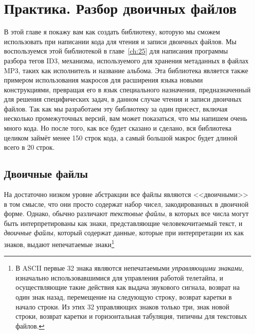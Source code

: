 \chapter{Практика. Разбор двоичных файлов}
\label{ch:24}

В этой главе я покажу вам как создать библиотеку, которую мы сможем использовать при
написании кода для чтения и записи двоичных файлов. Мы воспользуемся этой библиотекой в
главе~\ref{ch:25} для написания программы разбора тегов ID3, механизма, используемого для
хранения метаданных в файлах MP3, таких как исполнитель и название альбома. Эта библиотека
является также примером использования макросов для расширения языка новыми конструкциями,
превращая его в язык специального назначения, предназначенный для решения специфических
задач, в данном случае чтения и записи двоичных файлов. Так как мы разработаем эту
библиотеку за один присест, включая несколько промежуточных версий, вам может показаться,
что мы напишем очень много кода. Но после того, как все будет сказано и сделано, вся
библиотека целиком займёт менее 150 строк кода, а самый большой макрос будет длиной всего
в 20 строк.

\section{Двоичные файлы}

На достаточно низком уровне абстракции все файлы являются <<двоичными>> в том смысле, что
они просто содержат набор чисел, закодированных в двоичной форме.  Однако, обычно
различают \textit{текстовые файлы}, в которых все числа могут быть интерпретированы как
знаки, представляющие человекочитаемый текст, и \textit{двоичные файлы}, который содержат
данные, которые при интерпретации их как знаков, выдают непечатаемые знаки\footnote{В
  ASCII первые 32 знака являются непечатаемыми \textit{управляющими знаками}, изначально
  использовавшимися для управления работой телетайпа, и осуществляющие такие действия как
  выдача звукового сигнала, возврат на один знак назад, перемещение на следующую строку,
  возврат каретки в начало строки. Из этих 32 управляющих знаков только три, знак новой
  строки, возврат каретки и горизонтальная табуляция, типичны для текстовых файлов.}

